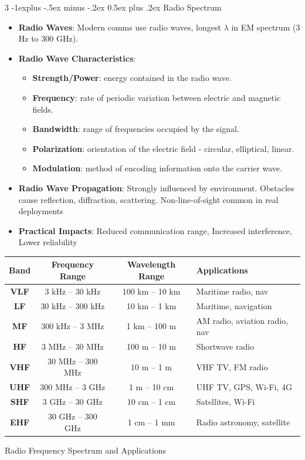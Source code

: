 \documentclass[a4paper, 9pt, landscape]{extarticle}
\makeatletter
\renewcommand{\subsection}{\@startsection{subsection}{2}{0mm}%
                                {-1explus -.5ex minus -.2ex}%
                                {0.5ex plus .2ex}%
                                {\normalfont\normalsize\bfseries}}
\makeatother
\begin{document}
\begin{multicols*}{3}
\subsection{Radio Spectrum}
\begin{itemize}
\item \textbf{Radio Waves}: Modern comms use radio waves, longest $\lambda$ in EM spectrum (3 Hz to 300 GHz).
\item \textbf{Radio Wave Characteristics}: 
  \begin{itemize}
    \item \textbf{Strength/Power}: energy contained in the radio wave.
    \item \textbf{Frequency}: rate of periodic variation between electric and magnetic fields. 
    \item \textbf{Bandwidth}: range of frequencies occupied by the signal.
    \item \textbf{Polarization}: orientation of the electric field - circular, elliptical, linear.
    \item \textbf{Modulation}: method of encoding information onto the carrier wave.
  \end{itemize}
\item \textbf{Radio Wave Propagation}: Strongly influenced by environment. Obstacles cause reflection, diffraction, scattering. Non-line-of-sight common in real deployments
\item \textbf{Practical Impacts}: Reduced communication range, Increased interference, Lower reliability
\end{itemize}

\begin{table}[H]
\centering \footnotesize
\begin{tabularx}{\columnwidth}{|c|c|c|X|}
\hline
\textbf{Band} & \textbf{Frequency Range} & \textbf{Wavelength Range} & \textbf{Applications} \\ \hline
\textbf{VLF} & 3 kHz -- 30 kHz & 100 km -- 10 km & Maritime radio, nav \\ \hline
\textbf{LF} & 30 kHz -- 300 kHz & 10 km -- 1 km & Maritime, navigation \\ \hline
\textbf{MF} & 300 kHz -- 3 MHz & 1 km -- 100 m & AM radio, aviation radio, nav \\ \hline
\textbf{HF} & 3 MHz -- 30 MHz & 100 m -- 10 m & Shortwave radio \\ \hline
\textbf{VHF} & 30 MHz -- 300 MHz & 10 m -- 1 m & VHF TV, FM radio \\ \hline
\textbf{UHF} & 300 MHz -- 3 GHz & 1 m -- 10 cm & UHF TV, GPS, Wi-Fi, 4G \\ \hline
\textbf{SHF} & 3 GHz -- 30 GHz & 10 cm -- 1 cm & Satellites, Wi-Fi \\ \hline
\textbf{EHF} & 30 GHz -- 300 GHz & 1 cm -- 1 mm & Radio astronomy, satellite \\ \hline
\end{tabularx}
\footnotesize Radio Frequency Spectrum and Applications
\end{table}



\end{multicols*}
\end{document}
